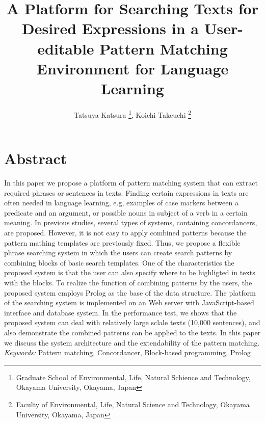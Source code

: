 \documentclass[11pt, onecolumn, twoside, a4paper]{article}
\title{A Platform for Searching Texts for Desired Expressions in a User-editable Pattern Matching Environment for Language Learning}
\author{Tatsuya Katsura \thanks{Graduate School of Environmental, Life, Natural Schience and Technology, Okayama University, Okayama, Japan}, Koichi Takeuchi \thanks{Faculty of Environmental, Life, Natural Science and Technology, Okayama University, Okayama, Japan} }
\date{}
\begin{document}
 

\maketitle
\thispagestyle{empty}

\section*{Abstract}
In this paper we propose a platform of pattern matching system that can extract required phrases or sentences in texts.
Finding certain expressions in texts are often needed in language learning, e.g, examples of case markers
between a predicate and an argument, or possible nouns in subject of a verb in a certain meaning. In previous studies,
several types of systems, containing concordancers, are proposed. However, it is not easy to apply combined
patterns because the pattern mathing templates are previously fixed.
Thus, we propose a flexible phrase searching system in which the users can create search patterns
by combining blocks of basic search templates. %
One of the characteristics the proposed system is that the user can also specify where to be highligted
in texts with the blocks.
To realize the function of combining patterns by the users, the proposed system employs
Prolog as the base of the data structure. The platform of the searching system is implemented
on an Web server with JavaScript-based interface and database system. 
In the performance test, we shows that the proposed system can deal with relatively large sclale texts
(10,000 sentences), and also demonstrate the combined patterns can be applied to the texts.
In this paper we discuss the system architecture and the extendability of the pattern matching. 
%
%
\\[2mm]
{\it Keywords: } Pattern matching, Concordancer, Block-based programming, Prolog
\end{document}
